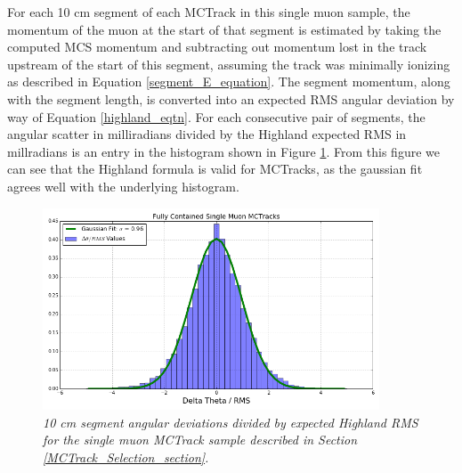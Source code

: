 For each 10 cm segment of each {\sc MCTrack} in this single muon sample, the momentum of the muon at the start of that segment is estimated by taking the computed MCS momentum and subtracting out momentum lost in the track upstream of the start of this segment, assuming the track was minimally ionizing as described in Equation \ref{segment_E_equation}. The segment momentum, along with the segment length, is converted into an expected RMS angular deviation by way of Equation \ref{highland_eqtn}. For each consecutive pair of segments, the angular scatter in milliradians divided by the Highland expected RMS in millradians is an entry in the histogram shown in Figure \ref{Highland_validation_MCTracks_fig}. From this figure we can see that the Highland formula is valid for {\sc MCTracks}, as the gaussian fit agrees well with the underlying histogram.

\begin{figure}[ht!]
\begin{center}
\includegraphics[width=100mm]{Figures/Highland_validation_SingleMuonMCTrack.png}
\end{center}
\caption{\textit{10 cm segment angular deviations divided by expected Highland RMS for the single muon {\sc MCTrack} sample described in Section \ref{MCTrack_Selection_section}.}}
\label{Highland_validation_MCTracks_fig}
\end{figure}















